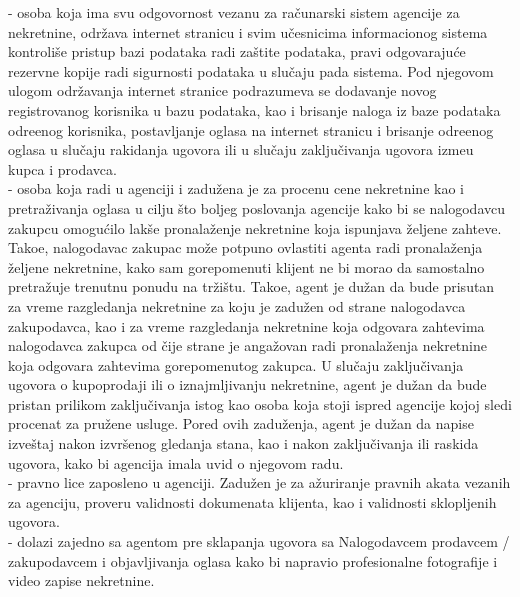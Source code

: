 \documentclass[20pt]{article}
\begin{document}
 - osoba koja ima svu odgovornost vezanu za ra\v{c}unarski sistem agencije za nekretnine, odr\v{z}ava internet stranicu i svim u\v{c}esnicima informacionog sistema kontroli\v{s}e pristup bazi podataka radi za\v{s}tite podataka, pravi odgovaraju\' ce rezervne kopije radi sigurnosti podataka u slu\v{c}aju pada sistema. Pod njegovom ulogom odr\v {z}avanja internet stranice podrazumeva se dodavanje novog registrovanog korisnika u bazu podataka, kao i brisanje naloga iz baze podataka odre\dj enog korisnika, postavljanje oglasa na internet stranicu i brisanje odre\dj enog oglasa u slu\v {c}aju rakidanja ugovora ili u slu\v {c}aju zaklju\v {c}ivanja ugovora izme\dj u kupca i prodavca.\\

 - osoba koja radi u agenciji i zadu\v{z}ena je za procenu cene nekretnine kao i pretra\v{z}ivanja oglasa u cilju \v{s}to boljeg poslovanja agencije kako bi se nalogodavcu zakupcu omogu\' cilo lak\v{s}e pronala\v{z}enje nekretnine koja ispunjava \v{z}eljene zahteve. Tako\dj e, nalogodavac zakupac mo\v{z}e potpuno ovlastiti agenta radi pronala\v {z}enja \v{z}eljene nekretnine, kako sam gorepomenuti klijent ne bi morao da samostalno pretra\v{z}uje trenutnu ponudu na tr\v{z}i\v{s}tu. Tako\dj e, agent je du\v{z}an da bude prisutan za vreme razgledanja nekretnine za koju je zadu\v {z}en od strane nalogodavca zakupodavca, kao i za vreme razgledanja nekretnine koja odgovara zahtevima nalogodavca zakupca od \v{c}ije strane je anga\v{z}ovan radi pronala\v{z}enja nekretnine koja odgovara zahtevima gorepomenutog zakupca. U slu\v {c}aju zaklju\v {c}ivanja ugovora o kupoprodaji ili o iznajmljivanju nekretnine, agent je du\v{z}an da bude pristan prilikom zaklju\v {c}ivanja istog kao osoba koja stoji ispred agencije kojoj sledi procenat za pru\v {z}ene usluge. Pored ovih zadu\v {z}enja, agent je du\v {z}an da napise izve\v {s}taj nakon izvr\v {s}enog gledanja stana, kao i nakon zaklju\v {c}ivanja ili raskida ugovora, kako bi agencija imala uvid o njegovom radu.\\

 - pravno lice zaposleno u agenciji. Zadu\v{z}en je za a\v{z}uriranje pravnih akata vezanih za agenciju, proveru validnosti dokumenata klijenta, kao i validnosti sklopljenih ugovora.\\ 

 - dolazi zajedno sa agentom pre sklapanja ugovora sa Nalogodavcem prodavcem / zakupodavcem i objavljivanja oglasa kako bi napravio profesionalne fotografije i video zapise nekretnine. 
\end{document}
